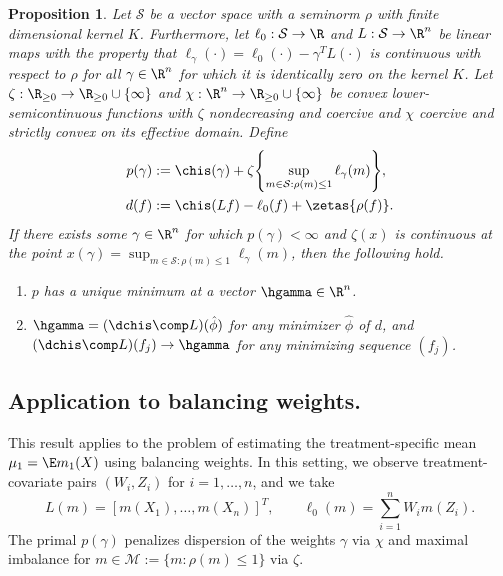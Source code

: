 \documentclass{article}
\newcommand{\model}{\mathcal{M}}
\newtheorem{proposition}[theorem]{Proposition}
\newcommand{\calS}{\mathcal{S}}
\begin{document}
\begin{proposition}
\label{prop:duality-full}
Let $\calS$ be a vector space with a seminorm $\rho$ with finite dimensional kernel $K$. Furthermore, let $\ell_0 : \calS \to \R$ and $L:\calS \to \R^n$ be linear maps with the property that $\ell_\gamma(\cdot) = \ell_0(\cdot) - \gamma^T L(\cdot)$ is continuous with respect to $\rho$ for all $\gamma \in \R^n$ for which it is identically zero on the kernel $K$.
Let $\zeta: \R_{\ge 0} \to \R_{\ge 0} \cup \{\infty\}$ and $\chi:\R^n \to \R_{\ge 0} \cup \{\infty\}$ be convex lower-semicontinuous functions with $\zeta$ nondecreasing and coercive and $\chi$ coercive and strictly convex on its effective domain. Define
\begin{align*}
p(\gamma) &:= \chis(\gamma) + \zeta\qty{\sup_{m \in \calS : \rho(m) \le 1} \ell_{\gamma}(m)}, \\
d(f) &:= \chis(Lf) - \ell_0(f) + \zetas\{\rho(f)\}.
\end{align*}
If there exists some $\gamma \in \R^n$ for which
$p(\gamma) < \infty$ and $\zeta(x)$ is continuous at the point $x(\gamma)=\sup_{m \in \calS : \rho(m) \le 1}\ell_{\gamma}(m)$, then the following hold.
\begin{enumerate}
    \item $p$ has a unique minimum at a vector $\hgamma \in \R^n$.
    \item $\hgamma = (\dchis \comp L)(\hat\phi)$ for any minimizer $\hat\phi$ of $d$, and $(\dchis \comp L)(f_j) \to \hgamma$ for any minimizing sequence $(f_j)$.
\end{enumerate}
\end{proposition}

\subsection{Application to balancing weights.} This result applies to the problem of estimating the treatment-specific mean $\mu_1 = \E m_1(X)$ using balancing weights. In this setting, we observe treatment-covariate pairs $(W_i, Z_i)$ for $i = 1, \ldots, n$, and we take
\[
L(m) = [m(X_1), \ldots, m(X_n)]^T, \qquad \ell_0(m) = \sum_{i=1}^n W_i m(Z_i).
\]
The primal $p(\gamma)$ penalizes dispersion of the weights $\gamma$ via $\chi$ and maximal imbalance for $m \in \model := \{ m : \rho(m) \le 1 \}$ via $\zeta$.
\end{document}
